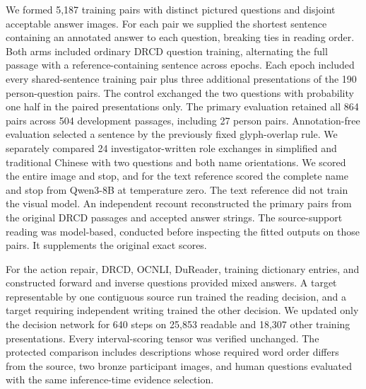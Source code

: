 \documentclass[12pt,a4paper]{article}
\providecommand{\DIFadd}[1]{{\protect\color{blue} \sf #1}} %
\begin{document}
\DIFadd{We formed 5,187 training pairs with distinct pictured questions and disjoint acceptable answer images. For each pair we supplied the shortest sentence containing an annotated answer to each question, breaking ties in reading order. Both arms included ordinary DRCD question training, alternating the full passage with a reference-containing sentence across epochs. Each epoch included every shared-sentence training pair plus three additional presentations of the 190 person-question pairs. The control exchanged the two questions with probability one half in the paired presentations only. The primary evaluation retained all 864 pairs across 504 development passages, including 27 person pairs. Annotation-free evaluation selected a sentence by the previously fixed glyph-overlap rule. We separately compared 24 investigator-written role exchanges in simplified and traditional Chinese with two questions and both name orientations. We scored the entire image and stop, and for the text reference scored the complete name and stop from Qwen3-8B at temperature zero. The text reference did not train the visual model. An independent recount reconstructed the primary pairs from the original DRCD passages and accepted answer strings. The source-support reading was model-based, conducted before inspecting the fitted outputs on those pairs. It supplements the original exact scores.
}

\DIFadd{For the action repair, DRCD, OCNLI, DuReader, training dictionary entries, and constructed forward and inverse questions provided mixed answers. A target representable by one contiguous source run trained the reading decision, and a target requiring independent writing trained the other decision. We updated only the decision network for 640 steps on 25,853 readable and 18,307 other training presentations. Every interval-scoring tensor was verified unchanged. The protected comparison includes descriptions whose required word order differs from the source, two bronze participant images, and human questions evaluated with the same inference-time evidence selection.
}
\end{document}
